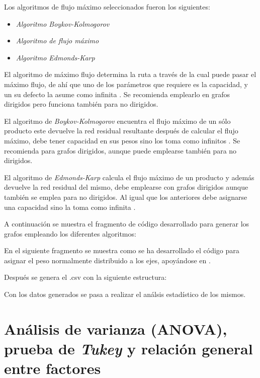 \documentclass{article}
\begin{document}
Los algoritmos de flujo máximo seleccionados fueron los siguientes:
\begin{itemize}
\item \textit{Algoritmo Boykov-Kolmogorov }
\item \textit{Algoritmo de flujo máximo}
\item \textit{Algoritmo Edmonds-Karp}
\end{itemize} 


El algoritmo de máximo flujo determina la ruta a través de la cual puede pasar el máximo flujo, de ahí que uno de los parámetros que requiere es la capacidad, y un su defecto la asume como infinita \cite{mf}. Se recomienda emplearlo en grafos dirigidos pero funciona también para no dirigidos.

El algoritmo de \textit{Boykov-Kolmogorov} encuentra el flujo máximo de un sólo producto este devuelve la red residual resultante después de calcular el flujo máximo, debe tener capacidad en sus pesos sino los toma como infinitos \cite{bk}. Se recomienda para grafos dirigidos, aunque puede emplearse también para no dirigidos. 

El algoritmo de \textit{Edmonds-Karp} calcula el flujo máximo de un producto y además devuelve la red residual del mismo, debe emplearse con grafos dirigidos aunque también se emplea para no dirigidos. Al igual que los anteriores debe asignarse una capacidad sino la toma como infinita \cite{ek}.

A continuación se muestra el fragmento de código desarrollado para generar los grafos empleando los diferentes algoritmos:

\newpage



En el siguiente fragmento se muestra como se ha desarrollado el código para asignar el peso normalmente distribuido a los ejes, apoyándose en \cite{tutorialpython}.



Después se genera el .csv con la siguiente estructura:
\newpage


Con los datos generados se pasa a realizar el análsis estadístico de los mismos.


\section{Análisis de varianza (ANOVA), prueba de \textit{Tukey} y relación general entre factores} 
\end{document}
